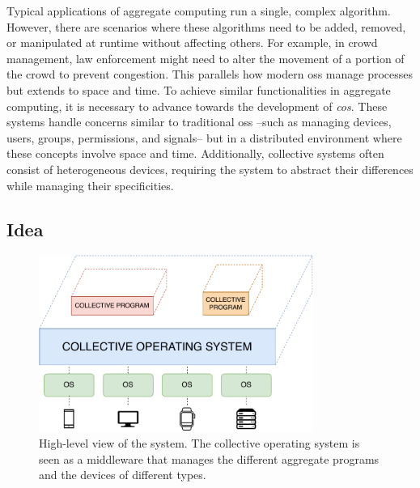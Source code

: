 \documentclass[12pt, a4paper]{article}
\begin{document}
Typical applications of aggregate computing run a single, complex algorithm.
%
However,
there are scenarios where these algorithms need to be added, removed,
or manipulated at runtime without affecting others.
%
For example, in crowd management,
law enforcement might need to alter the movement of a portion of the crowd to prevent congestion.
%
This parallels how modern \acp{os} manage processes but extends to space and time.
%
To achieve similar functionalities in aggregate computing,
it is necessary to advance towards the development of \emph{\ac{cos}}.
%
These systems handle concerns similar to traditional \acp{os} --such as managing devices, users, groups, permissions, and signals--
but in a distributed environment where these concepts involve space and time.
%
Additionally,
collective systems often consist of heterogeneous devices,
requiring the system to abstract their differences while managing their specificities.

\subsection{Idea}
\label{subsec:idea}

\begin{figure}
    \centering
    \includegraphics[width=0.8\textwidth]{figures/system}
    \caption{
        High-level view of the system.
        The collective operating system is seen as a middleware that manages the different aggregate programs and the devices
        of different types.
    }\label{fig:system}
\end{figure}
\end{document}
